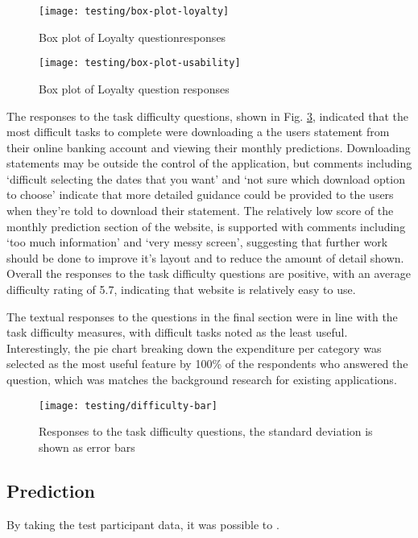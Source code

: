 \begin{figure}
\centering
\texttt{[image: testing/box-plot-loyalty]}
\caption{Box plot of Loyalty questionresponses\protect\footnotemark}
\label{fig:box-loyalty}
\end{figure}


\begin{figure}
\centering
\texttt{[image: testing/box-plot-usability]}
\caption{Box plot of Loyalty question responses}
\label{fig:box-usablity}
\end{figure}

The responses to the task difficulty questions, shown in Fig. \ref{fig:box-difficulty}, indicated that the most difficult tasks to complete were downloading a the users statement from their online banking account and viewing their monthly predictions.
%
Downloading statements may be outside the control of the application, but comments including `difficult selecting the dates that you want' and `not sure which download option to choose' indicate that more detailed guidance could be provided to the users when they're told to download their statement.
%
The relatively low score of the monthly prediction section of the website, is supported with comments including `too much information' and `very messy screen', suggesting that further work should be done to improve it's layout and to reduce the amount of detail shown.
%
Overall the responses to the task difficulty questions are positive, with an average difficulty rating of 5.7, indicating that website is relatively easy to use.

The textual responses to the questions in the final section were in line with the task difficulty measures, with difficult tasks noted as the least useful. Interestingly, the pie chart breaking down the expenditure per category was selected as the most useful feature by 100\% of the respondents who answered the question, which was matches the background research for existing applications.

\begin{figure}
\centering
\texttt{[image: testing/difficulty-bar]}
\caption{Responses to the task difficulty questions, the standard deviation is shown as error bars}
\label{fig:box-difficulty}
\end{figure}

\subsection{Prediction}
By taking the test participant data, it was possible to .


